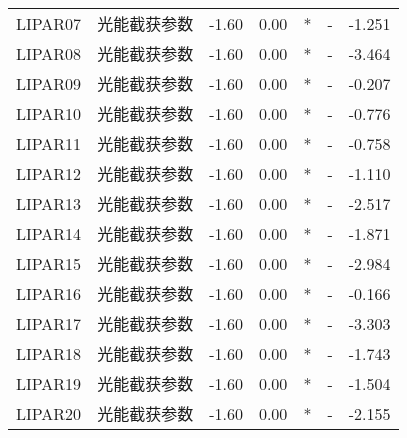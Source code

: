 \begin{longtable}{llrrcrr}
    LIPAR07  & 光能截获参数               & -1.60  & 0.00   & *   & -       & -1.251  \\
    LIPAR08  & 光能截获参数               & -1.60  & 0.00   & *   & -       & -3.464  \\
    LIPAR09  & 光能截获参数               & -1.60  & 0.00   & *   & -       & -0.207  \\
    LIPAR10  & 光能截获参数               & -1.60  & 0.00   & *   & -       & -0.776  \\
    LIPAR11  & 光能截获参数               & -1.60  & 0.00   & *   & -       & -0.758  \\
    LIPAR12  & 光能截获参数               & -1.60  & 0.00   & *   & -       & -1.110  \\
    LIPAR13  & 光能截获参数               & -1.60  & 0.00   & *   & -       & -2.517  \\
    LIPAR14  & 光能截获参数               & -1.60  & 0.00   & *   & -       & -1.871  \\
    LIPAR15  & 光能截获参数               & -1.60  & 0.00   & *   & -       & -2.984  \\
    LIPAR16  & 光能截获参数               & -1.60  & 0.00   & *   & -       & -0.166  \\
    LIPAR17  & 光能截获参数               & -1.60  & 0.00   & *   & -       & -3.303  \\
    LIPAR18  & 光能截获参数               & -1.60  & 0.00   & *   & -       & -1.743  \\
    LIPAR19  & 光能截获参数               & -1.60  & 0.00   & *   & -       & -1.504  \\
    LIPAR20  & 光能截获参数               & -1.60  & 0.00   & *   & -       & -2.155  \\
\end{longtable}
